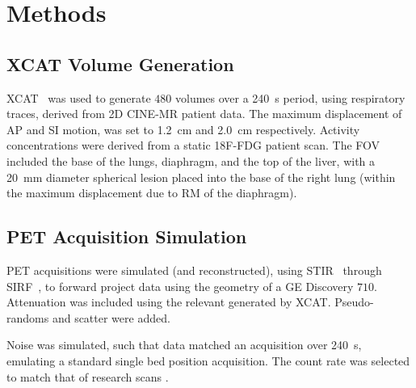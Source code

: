 
\section{Methods} \label{sec:methods}
    \subsection{\acrshort{XCAT} Volume Generation} \label{sec:xcat_volume_generation}
        \acrshort{XCAT}~\cite{Segars2010} was used to generate $480$ volumes over a \SI{240}{\second} period, using respiratory traces, derived from \acrshort{2D} CINE-\acrshort{MR} patient data. The maximum displacement of \gls{AP} and \gls{SI} motion, was set to \SI{1.2}{\centi\metre} and \SI{2.0}{\centi\metre} respectively. Activity concentrations were derived from a static \acrshort{18F-FDG} patient scan. The \acrlong{FOV} included the base of the lungs, diaphragm, and the top of the liver, with a \SI{20}{\milli\metre} diameter spherical lesion %
        placed into the base of the right lung (within the maximum displacement due to \acrlong{RM} of the diaphragm).
    
    
    \subsection{\acrshort{PET} Acquisition Simulation} \label{sec:pet_acquisition_simulation}
        \acrshort{PET} acquisitions were simulated (and reconstructed), using \acrshort{STIR}~\cite{Thielemans2012, Nikos2019} through \acrshort{SIRF}~\cite{Ovtchinnikov2017}, to forward project data using the geometry of a \acrshort{GE} Discovery $710$. Attenuation was included using the relevant  generated by \acrshort{XCAT}. Pseudo-randoms and scatter were added.%
        
        Noise was simulated, such that data matched an acquisition over \SI{240}{\second}, emulating a standard single bed position acquisition. The count rate was selected to match that of research scans%
        .
        
